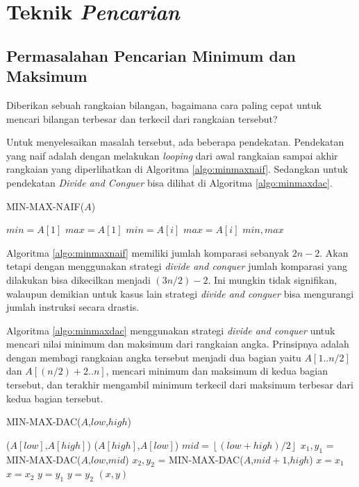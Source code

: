 \chapter{Teknik \textit{Pencarian}}\label{ch:modul4}

\section{Permasalahan Pencarian Minimum dan Maksimum}
Diberikan sebuah rangkaian bilangan, bagaimana cara paling cepat untuk mencari bilangan terbesar dan terkecil dari rangkaian tersebut? 

Untuk menyelesaikan masalah tersebut, ada beberapa pendekatan. Pendekatan yang naif adalah dengan melakukan \textit{looping} dari awal rangkaian sampai akhir rangkaian yang diperlihatkan di Algoritma \ref{algo:minmaxnaif}. Sedangkan untuk pendekatan \textit{Divide and Conguer} bisa dilihat di Algoritma \ref{algo:minmaxdac}.

\begin{algorithm}[H]
	\caption{MIN-MAX-NAIF($A$)}
	\label{algo:minmaxnaif}
	\begin{algorithmic}[1]
		\STATE $min = A[1]$
		\STATE $max = A[1]$
				\STATE $min = A[i]$
			\ENDIF
				\STATE $max = A[i]$
			\ENDIF
		\ENDFOR
		\RETURN $min,max$
	\end{algorithmic}
\end{algorithm}

Algoritma \ref{algo:minmaxnaif} memiliki jumlah komparasi sebanyak $2n-2$. Akan tetapi dengan menggunakan strategi \textit{divide and conquer} jumlah komparasi yang dilakukan bisa dikecilkan menjadi $(3n/2)-2$. Ini mungkin tidak signifikan, walaupun demikian untuk kasus lain strategi \textit{divide and conguer} bisa mengurangi jumlah instruksi secara drastis. 

Algoritma \ref{algo:minmaxdac} menggunakan strategi \textit{divide and conquer} untuk mencari nilai minimum dan maksimum dari rangkaian angka. Prinsipnya adalah dengan membagi rangkaian angka tersebut menjadi dua bagian yaitu $A[1..n/2]$ dan $A[(n/2)+2..n]$, mencari minimum dan maksimum di kedua bagian tersebut, dan terakhir mengambil minimum terkecil dari maksimum terbesar dari kedua bagian tersebut.

\begin{algorithm}[H]
	\caption{MIN-MAX-DAC($A$,$low$,$high$)}
	\label{algo:minmaxdac}
	\begin{algorithmic}[1]
				\RETURN ($A[low]$,$A[high]$)
			\ELSE
				\RETURN ($A[high]$,$A[low]$)
			\ENDIF
		\ELSE
			\STATE $mid = \left\lfloor (low+high)/2\right\rfloor$
			\STATE $x_1,y_1$ = MIN-MAX-DAC($A$,$low$,$mid$)
			\STATE $x_2,y_2$ = MIN-MAX-DAC($A$,$mid+1$,$high$)
				\STATE $x = x_1$
			\ELSE
				\STATE $x = x_2$
			\ENDIF
				\STATE $y = y_1$
			\ELSE
				\STATE $y = y_2$
			\ENDIF  
			\RETURN $(x,y)$
		\ENDIF
	\end{algorithmic}
\end{algorithm}



